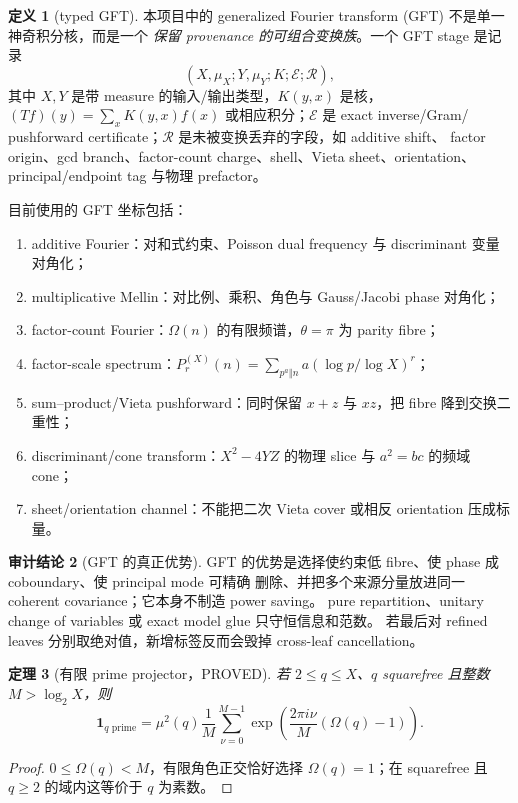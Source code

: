 \documentclass[11pt,a4paper]{ctexart}
\newtheorem{theorem}{定理}[section]
\theoremstyle{definition}
\newtheorem{definition}[theorem]{定义}
\newtheorem{audit}[theorem]{审计结论}
\newcommand{\1}{\mathbf 1}
\newcommand{\PROVED}{\textcolor{green!40!black}{\textsf{PROVED}}}
\begin{document}
\begin{definition}[typed GFT]
本项目中的 generalized Fourier transform (GFT) 不是单一神奇积分核，而是一个
\emph{保留 provenance 的可组合变换族}。一个 GFT stage 是记录
\[
 (X,\mu_X;Y,\mu_Y;K;\mathcal E;\mathcal R),          \tag{GFT.1}
\]
其中 $X,Y$ 是带 measure 的输入/输出类型，$K(y,x)$ 是核，
$(Tf)(y)=\sum_xK(y,x)f(x)$ 或相应积分；$\mathcal E$ 是 exact inverse/Gram/
pushforward certificate；$\mathcal R$ 是未被变换丢弃的字段，如 additive shift、
factor origin、gcd branch、factor-count charge、shell、Vieta sheet、orientation、
principal/endpoint tag 与物理 prefactor。
\end{definition}

目前使用的 GFT 坐标包括：
\begin{enumerate}
\item additive Fourier：对和式约束、Poisson dual frequency 与 discriminant 变量对角化；
\item multiplicative Mellin：对比例、乘积、角色与 Gauss/Jacobi phase 对角化；
\item factor-count Fourier：$\Omega(n)$ 的有限频谱，$\theta=\pi$ 为 parity fibre；
\item factor-scale spectrum：$P_r^{(X)}(n)=\sum_{p^a\Vert n}a(\log p/\log X)^r$；
\item sum--product/Vieta pushforward：同时保留 $x+z$ 与 $xz$，把 fibre 降到交换二重性；
\item discriminant/cone transform：$X^2-4YZ$ 的物理 slice 与 $a^2=bc$ 的频域 cone；
\item sheet/orientation channel：不能把二次 Vieta cover 或相反 orientation 压成标量。
\end{enumerate}

\begin{audit}[GFT 的真正优势]
GFT 的优势是选择使约束低 fibre、使 phase 成 coboundary、使 principal mode 可精确
删除、并把多个来源分量放进同一 coherent covariance；它本身不制造 power saving。
pure repartition、unitary change of variables 或 exact model glue 只守恒信息和范数。
若最后对 refined leaves 分别取绝对值，新增标签反而会毁掉 cross-leaf cancellation。
\end{audit}

\begin{theorem}[有限 prime projector，\PROVED]
若 $2\le q\le X$、$q$ squarefree 且整数 $M>\log_2X$，则
\[
 \1_{q\text{ prime}}=\mu^2(q)\frac1M\sum_{\nu=0}^{M-1}
 \exp\!\left(\frac{2\pi i\nu}{M}(\Omega(q)-1)\right).\tag{GFT.2}
\]
\end{theorem}
\begin{proof}
$0\le\Omega(q)<M$，有限角色正交恰好选择 $\Omega(q)=1$；在 squarefree 且
$q\ge2$ 的域内这等价于 $q$ 为素数。
\end{proof}
\end{document}
